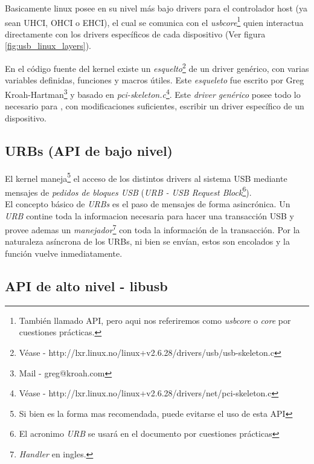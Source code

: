 Basicamente linux posee en su nivel m\'as bajo drivers para el controlador
host (ya sean UHCI, OHCI o EHCI), el cual se comunica con el
\emph{usbcore}\footnote{Tambi\'en llamado API, pero aqui nos referiremos como
\emph{usbcore} o \emph{core} por cuestiones pr\'acticas.} quien interactua
directamente con los drivers espec\'ificos de cada dispositivo (Ver figura
\ref{fig:usb_linux_layers}).


En el c\'odigo fuente del kernel existe un \emph{esquelto}\footnote{V\'ease
- http://lxr.linux.no/linux+v2.6.28/drivers/usb/usb-skeleton.c} de un driver
gen\'erico, con varias variables definidas, funciones y macros \'utiles.
Este \emph{esqueleto} fue escrito por Greg Kroah-Hartman\footnote{Mail - 
greg@kroah.com} y basado en \emph{pci-skeleton.c}\footnote{V\'ease -
http://lxr.linux.no/linux+v2.6.28/drivers/net/pci-skeleton.c}.
Este \emph{driver gen\'erico} posee todo lo necesario para , con
modificaciones suficientes, escribir un driver espec\'ifico de un dispositivo.


\subsection{URBs (API de bajo nivel)}

El kernel maneja\footnote{Si bien es la forma mas recomendada, puede evitarse
el uso de esta API} el acceso de los distintos drivers al sistema USB mediante
mensajes de \emph{pedidos de bloques USB} (\emph{URB - USB Request
Block}\footnote{El acronimo \emph{URB} se usar\'a en el documento por
cuestiones pr\'acticas}).\\

El concepto b\'asico de \emph{URBs} es el paso de mensajes de forma
asincr\'onica. 
Un \emph{URB} contine toda la informacion necesaria para hacer una
transacci\'on USB y provee ademas un \emph{manejador}\footnote{\emph{Handler}
en ingles.} con toda la informaci\'on de la transacci\'on.
Por la naturaleza as\'incrona de los URBs, ni bien se env\'ian, estos son
encolados y la funci\'on vuelve inmediatamente. 



\subsection{API de alto nivel - libusb}

